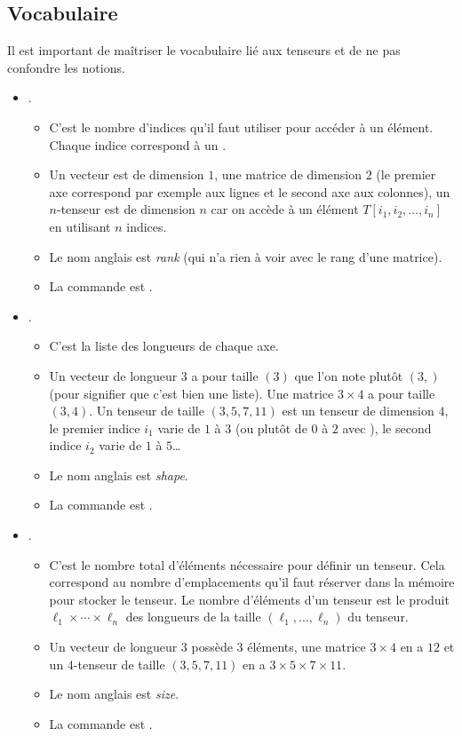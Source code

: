 \documentclass[11pt,class=report,crop=false]{standalone}
\begin{document}
\subsection{Vocabulaire}


Il est important de maîtriser le vocabulaire lié aux tenseurs et de ne pas confondre les notions.

\begin{itemize}
  \item {}. 
  \begin{itemize}
    \item C'est le nombre d'indices qu'il faut utiliser pour accéder à un élément. 
    Chaque indice correspond à un .
    \item Un vecteur est de dimension $1$, une matrice de dimension $2$ (le premier axe correspond par exemple aux lignes et le second axe aux colonnes), un $n$-tenseur est de dimension $n$ car on accède à un élément $T[i_1,i_2,\ldots,i_n]$ en utilisant $n$ indices.
    \item Le nom anglais est \emph{rank} (qui n'a rien à voir avec le rang d'une matrice).   
    \item La commande est .
 \end{itemize}
  
  \item {}.
    \begin{itemize}
      \item C'est la liste des longueurs de chaque axe.
      \item Un vecteur de longueur $3$ a pour taille $(3)$ que l'on note plutôt $(3,)$ (pour signifier que c'est bien une liste). Une matrice $3\times 4$ a pour taille $(3,4)$. Un tenseur de taille $(3,5,7,11)$ est un tenseur de dimension $4$, le premier indice $i_1$ varie de $1$ à $3$ (ou plutôt de $0$ à $2$ avec \Python), le second indice $i_2$ varie de $1$ à $5$\ldots
      \item Le nom anglais est \emph{shape}.     
      \item La commande est .
    \end{itemize}
    
  
  \item {}.
    \begin{itemize}
      \item C'est le nombre total d'éléments nécessaire pour définir un tenseur. Cela correspond au nombre d'emplacements qu'il faut réserver dans la mémoire pour stocker le tenseur. Le nombre d'éléments d'un tenseur est le produit $\ell_1 \times \cdots \times \ell_n$ des longueurs de la taille $(\ell_1,\ldots,\ell_n)$ du tenseur.
      \item Un vecteur de longueur $3$ possède $3$ éléments, une matrice $3\times 4$ en a $12$ et un $4$-tenseur de taille $(3,5,7,11)$ en a $3\times5\times7\times 11$.
      \item Le nom anglais est \emph{size}.       
      \item La commande est .


\end{itemize}
\end{itemize}
\end{document}
